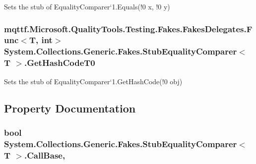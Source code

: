 Sets the stub of Equality\-Comparer`1.Equals(!0 x, !0 y)

\hypertarget{class_system_1_1_collections_1_1_generic_1_1_fakes_1_1_stub_equality_comparer_3_01_t_01_4_aa03072c7dc21f4a8e3de587752be3bc4}{
\subsubsection[{Get\-Hash\-Code\-T0}]{\setlength{\rightskip}{0pt plus 5cm}mqttf.\-Microsoft.\-Quality\-Tools.\-Testing.\-Fakes.\-Fakes\-Delegates.\-Func$<$T, int$>$ System.\-Collections.\-Generic.\-Fakes.\-Stub\-Equality\-Comparer$<$ T $>$.Get\-Hash\-Code\-T0}}\label{class_system_1_1_collections_1_1_generic_1_1_fakes_1_1_stub_equality_comparer_3_01_t_01_4_aa03072c7dc21f4a8e3de587752be3bc4}


Sets the stub of Equality\-Comparer`1.Get\-Hash\-Code(!0 obj)



\subsection{Property Documentation}
\hypertarget{class_system_1_1_collections_1_1_generic_1_1_fakes_1_1_stub_equality_comparer_3_01_t_01_4_af7c53d68d6ebd16ecbe08095f1b4b7e7}{
\subsubsection[{Call\-Base}]{\setlength{\rightskip}{0pt plus 5cm}bool System.\-Collections.\-Generic.\-Fakes.\-Stub\-Equality\-Comparer$<$ T $>$.Call\-Base\hspace{0.3cm}{\ttfamily [get]}, {\ttfamily [set]}}}\label{class_system_1_1_collections_1_1_generic_1_1_fakes_1_1_stub_equality_comparer_3_01_t_01_4_af7c53d68d6ebd16ecbe08095f1b4b7e7}


